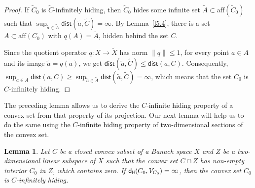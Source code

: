 \documentclass{amsart}
\newcommand{\dist}{\mathsf{dist}}
\newcommand{\aff}{\mathrm{aff}}
\newcommand{\dH}{\mathsf{d}_{\mathsf H}\kern-1pt}
\newtheorem{lemma}[theorem]{Lemma}
\theoremstyle{definition}
\begin{document}
\begin{proof} If $\tilde C_0$ is $\tilde C$-infinitely hiding, then $\tilde C_0$ hides some infinite set $\tilde A\subset \aff(\tilde C_0)$ such that $\sup_{\tilde a\in \tilde A}\dist(\tilde a,\tilde C)=\infty$. By Lemma~\ref{l5.4}, there is a set $A\subset \aff(C_0)$ with $q(A)=\tilde A$, hidden behind the set $C$.

Since the quotient operator $q:X\to \tilde X$ has norm $\|q\|\le 1$, for every point $a\in A$ and its image $\tilde a=q(a)$,  we get $\dist(\tilde a,\tilde C)\le \dist(a,C)$. Consequently, $\sup_{a\in A}\dist(a,C)\ge \sup_{\tilde a\in \tilde A}\dist(\tilde a,\tilde C)=\infty$, which means that the set  $C_0$ is $C$-infinitely hiding.
\end{proof}

The preceding lemma allows us to derive the $C$-infinite hiding property of a convex set from that property of its projection. Our next lemma will help us to do the same using the $C$-infinite hiding property of two-dimensional sections of the convex set.

\begin{lemma}\label{l5.6} Let $C$ be a closed convex subset of a Banach space $X$ and $Z$ be a two-dimensional linear subspace of $X$ such that the convex set $C\cap Z$ has non-empty interior $C_0$ in $Z$, which contains zero. If $\dH(C_0,V_{C_0})=\infty$, then the convex set $C_0$ is $C$-infinitely hiding.
\end{lemma}
\end{document}
